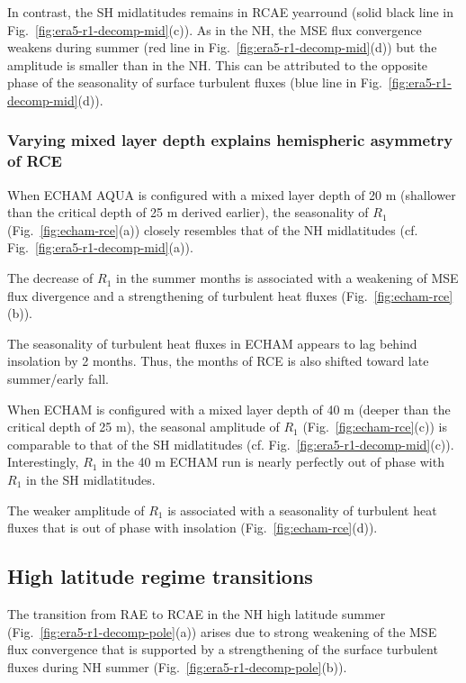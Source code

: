 \documentclass{ametsocV5}
\begin{document}
    In contrast, the SH midlatitudes remains in RCAE yearround (solid black line in Fig.~\ref{fig:era5-r1-decomp-mid}(c)). As in the NH, the MSE flux convergence weakens during summer (red line in Fig.~\ref{fig:era5-r1-decomp-mid}(d)) but the amplitude is smaller than in the NH. This can be attributed to the opposite phase of the seasonality of surface turbulent fluxes (blue line in Fig.~\ref{fig:era5-r1-decomp-mid}(d)).
    
    \subsubsection{Varying mixed layer depth explains hemispheric asymmetry of RCE}
        When ECHAM AQUA is configured with a mixed layer depth of 20 m (shallower than the critical depth of 25 m derived earlier), the seasonality of \(R_{1}\) (Fig.~\ref{fig:echam-rce}(a)) closely resembles that of the NH midlatitudes (cf. Fig.~\ref{fig:era5-r1-decomp-mid}(a)).
        
        The decrease of \(R_{1}\) in the summer months is associated with a weakening of MSE flux divergence and a strengthening of turbulent heat fluxes (Fig.~\ref{fig:echam-rce}(b)).
        
        The seasonality of turbulent heat fluxes in ECHAM appears to lag behind insolation by 2 months. Thus, the months of RCE is also shifted toward late summer/early fall.
        
        When ECHAM is configured with a mixed layer depth of 40 m (deeper than the critical depth of 25 m), the seasonal amplitude of \(R_{1}\) (Fig.~\ref{fig:echam-rce}(c)) is comparable to that of the SH midlatitudes (cf. Fig.~\ref{fig:era5-r1-decomp-mid}(c)). Interestingly, \(R_{1}\) in the 40 m ECHAM run is nearly perfectly out of phase with \(R_{1}\) in the SH midlatitudes.
  
        The weaker amplitude of \(R_{1}\) is associated with a seasonality of turbulent heat fluxes that is out of phase with insolation (Fig.~\ref{fig:echam-rce}(d)).
  
\subsection{High latitude regime transitions}
    The transition from RAE to RCAE in the NH high latitude summer (Fig.~\ref{fig:era5-r1-decomp-pole}(a)) arises due to strong weakening of the MSE flux convergence that is supported by a strengthening of the surface turbulent fluxes during NH summer (Fig.~\ref{fig:era5-r1-decomp-pole}(b)).
    
\end{document}
